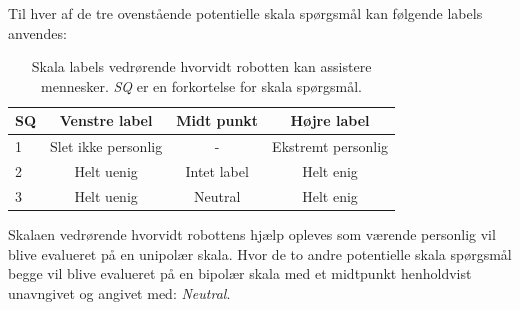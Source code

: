 \noindent
%
Til hver af de tre ovenstående potentielle skala spørgsmål kan følgende labels anvendes:
%
\begin{table}[H]
	\centering
	\begin{tabular}{l|c|c|c}
		SQ     & Venstre label & Midt punkt & Højre label \\\hline
		1   & Slet ikke personlig & - & Ekstremt personlig          \\\hline
		2   & Helt uenig & Intet label & Helt enig   \\\hline
		3   & Helt uenig & Neutral & Helt enig  
	\end{tabular}
\caption{Skala labels vedrørende hvorvidt robotten kan assistere mennesker. \textit{SQ} er en forkortelse for skala spørgsmål.}
	\label{tab:AssistererMennesker}
\end{table}
\noindent
%
Skalaen vedrørende hvorvidt robottens hjælp opleves som værende personlig vil blive evalueret på en unipolær skala. Hvor de to andre potentielle skala spørgsmål begge vil blive evalueret på en bipolær skala med et midtpunkt henholdvist unavngivet og angivet med: \textit{Neutral}.
\newpage
%
